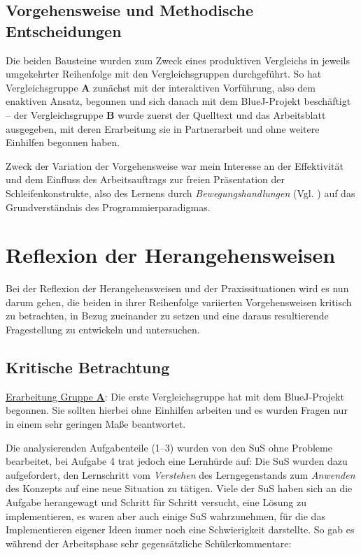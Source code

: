 \documentclass[paper=a4, DIV=13, BCOR=12mm, twoside=on, onecolumn=on, open = any, titlepage =on, parskip =half-, headsepline = on, footsepline = on, chapterprefix = on, sectionprefix = on, appendixprefix = off, fontsize = 11pt, numbers = noenddot, abstract = off]{scrreprt}
\begin{document}
\par \singlespacing
 \section{Vorgehensweise und Methodische Entscheidungen}
 \label{sec:vorgehensweisen}
\onehalfspacing

Die beiden Bausteine wurden zum Zweck eines produktiven Vergleichs in jeweils umgekehrter Reihenfolge mit den Vergleichsgruppen durchgeführt. So hat Vergleichsgruppe \textsc{\textbf{A}} zunächst mit der interaktiven Vorführung, also dem enaktiven Ansatz, begonnen und sich danach mit dem BlueJ-Projekt beschäftigt -- der Vergleichsgruppe \textsc{\textbf{B}} wurde zuerst der Quelltext und das Arbeitsblatt ausgegeben, mit deren Erarbeitung sie in Partnerarbeit und ohne weitere Einhilfen begonnen haben. 

Zweck der Variation der Vorgehensweise war mein Interesse an der Effektivität und dem Einfluss des Arbeitsauftrags zur freien Präsentation der Schleifenkonstrukte, also des Lernens durch \emph{Bewegungshandlungen} (Vgl. \cite[S.183f.]{aebli:11}) auf das Grundverständnis des Programmierparadigmas.



\par \singlespacing
\chapter{Reflexion der Herangehensweisen}
\onehalfspacing
 Bei der Reflexion der Herangehensweisen und der Praxissituationen wird es nun darum gehen, die beiden in ihrer Reihenfolge variierten Vorgehensweisen kritisch zu betrachten, in Bezug zueinander zu setzen und eine daraus resultierende Fragestellung zu entwickeln und untersuchen.

\par \singlespacing
\section{Kritische Betrachtung}
\onehalfspacing

\underline{Erarbeitung Gruppe \textsc{\textbf{A}}}: Die erste Vergleichsgruppe hat mit dem BlueJ-Projekt begonnen. Sie sollten hierbei ohne Einhilfen arbeiten und es wurden Fragen nur in einem sehr geringen Maße beantwortet. 

Die analysierenden Aufgabenteile (1--3) wurden von den SuS ohne Probleme bearbeitet, bei Aufgabe 4 trat jedoch eine Lernhürde auf: Die SuS wurden dazu aufgefordert, den Lernschritt vom \emph{Verstehen} des Lerngegenstands zum \emph{Anwenden} des Konzepts auf eine neue Situation zu tätigen. Viele der SuS haben sich an die Aufgabe herangewagt und Schritt für Schritt versucht, eine Lösung zu implementieren, es waren aber auch einige SuS wahrzunehmen, für die das Implementieren eigener Ideen immer noch eine Schwierigkeit darstellte. So gab es während der Arbeitsphase sehr gegensätzliche Schülerkommentare:
\end{document}
